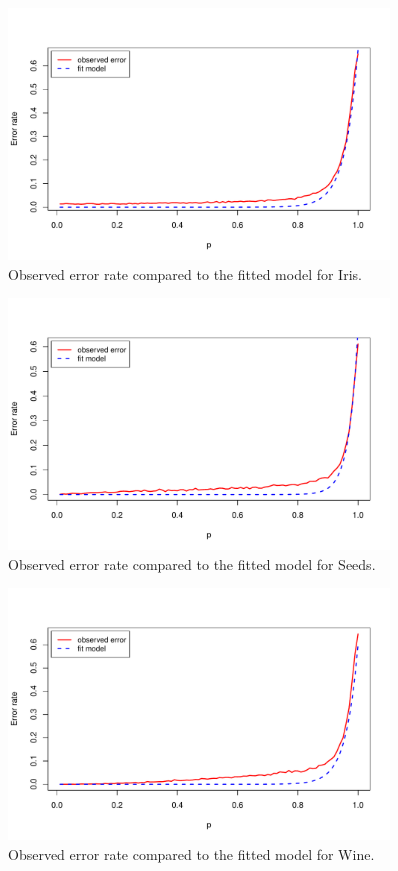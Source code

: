 \documentclass{article}
\begin{document}
\begin{figure}
 \centering
 \includegraphics[width=0.9\textwidth]{./figures/iris.pdf}
 \caption{Observed error rate compared to the fitted model for Iris.}
 \label{fig:iris}
\end{figure}

\begin{figure}
 \centering
 \includegraphics[width=0.9\textwidth]{./figures/seeds.pdf}
 \caption{Observed error rate compared to the fitted model for Seeds.}
 \label{fig:seeds}
\end{figure}

\begin{figure}
 \centering
 \includegraphics[width=0.9\textwidth]{./figures/wine.pdf}
 \caption{Observed error rate compared to the fitted model for Wine.}
 \label{fig:wine}
\end{figure}
\end{document}

